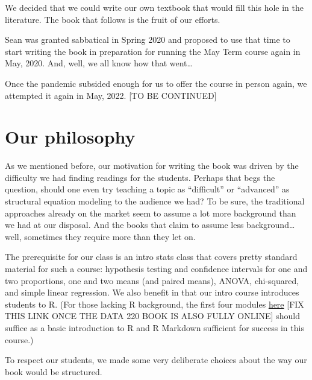 \documentclass[
]{book}
\begin{document}
We decided that we could write our own textbook that would fill this hole in the literature. The book that follows is the fruit of our efforts.

Sean was granted sabbatical in Spring 2020 and proposed to use that time to start writing the book in preparation for running the May Term course again in May, 2020. And, well, we all know how that went\ldots{}

Once the pandemic subsided enough for us to offer the course in person again, we attempted it again in May, 2022. {[}TO BE CONTINUED{]}

\hypertarget{our-philosophy}{%
\section*{Our philosophy}\label{our-philosophy}}

As we mentioned before, our motivation for writing the book was driven by the difficulty we had finding readings for the students. Perhaps that begs the question, should one even try teaching a topic as ``difficult'' or ``advanced'' as structural equation modeling to the audience we had? To be sure, the traditional approaches already on the market seem to assume a lot more background than we had at our disposal. And the books that claim to assume less background\ldots well, sometimes they require more than they let on.

The prerequisite for our class is an intro stats class that covers pretty standard material for such a course: hypothesis testing and confidence intervals for one and two proportions, one and two means (and paired means), ANOVA, chi-squared, and simple linear regression. We also benefit in that our intro course introduces students to R. (For those lacking R background, the first four modules \href{https://github.com/VectorPosse/Intro_Stats}{here} {[}FIX THIS LINK ONCE THE DATA 220 BOOK IS ALSO FULLY ONLINE{]} should suffice as a basic introduction to R and R Markdown sufficient for success in this course.)

To respect our students, we made some very deliberate choices about the way our book would be structured.
\end{document}
